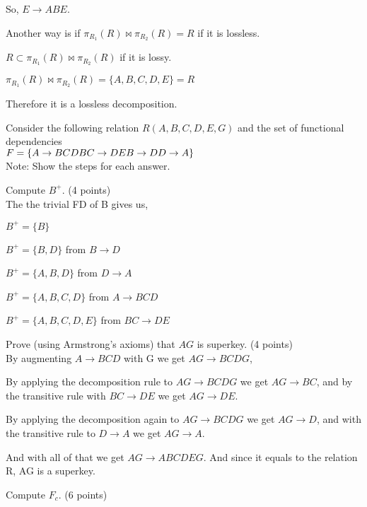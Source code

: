 \documentclass[a4 paper]{article}
\begin{document}
So, $E \rightarrow ABE$.

Another way is if $\pi_{R_1} (R) \bowtie \pi_{R_2} (R) = R$ if it is lossless.

$R \subset \pi_{R_1} (R) \bowtie \pi_{R_2} (R)$ if it is lossy.

$\pi_{R_1} (R) \bowtie \pi_{R_2} (R) = \{A,B,C,D,E\} = R$

Therefore it is a lossless decomposition.

Consider the following relation $R(A, B, C, D, E, G)$ and the set of functional dependencies \\$F = \{
\\A \rightarrow BCD\\
BC \rightarrow DE\\
B \rightarrow D\\
D \rightarrow A\}$\\

\noindent Note: Show the steps for each answer.

 Compute $B^{+}$. \indent (4 points)\\

The the trivial FD of B gives us,

$B^{+} = \{B\}$

$B^{+} = \{B,D\}$ from $B \rightarrow D$

$B^{+} = \{A,B,D\}$ from $D \rightarrow A$

$B^{+} = \{A,B,C,D\}$ from $A \rightarrow BCD$

$B^{+} = \{A,B,C,D,E\}$ from $BC \rightarrow DE$

 Prove (using Armstrong's axioms) that $AG$ is superkey. \indent (4 points)\\

By augmenting $A \rightarrow BCD$ with G we get $AG \rightarrow BCDG$,

By applying the decomposition rule to $AG \rightarrow BCDG$ we get $AG \rightarrow BC$,
and by the transitive rule with $BC \rightarrow DE$ we get $AG \rightarrow DE$.

By applying the decomposition again to $AG \rightarrow BCDG$ we get $AG \rightarrow D$,
and with the transitive rule to $D \rightarrow A$ we get $AG \rightarrow A$.

And with all of that we get $AG \rightarrow ABCDEG$. And since it equals to the relation R, AG is a superkey.

 Compute $F_{c}$. \indent (6 points)\\
\end{document}

